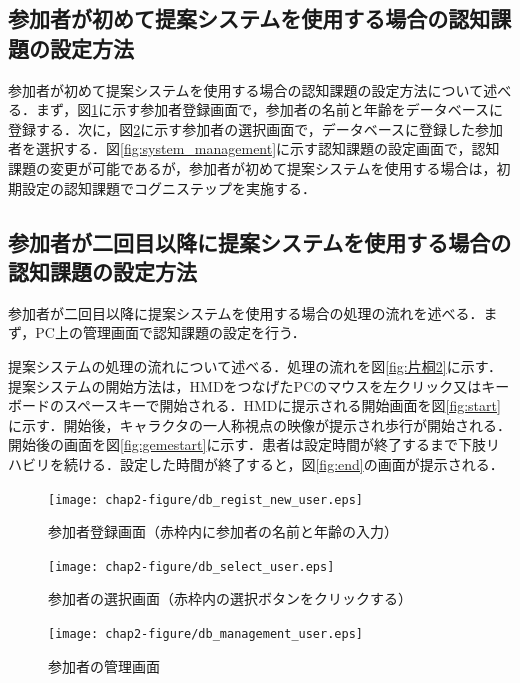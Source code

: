 \subsection{参加者が初めて提案システムを使用する場合の認知課題の設定方法}
参加者が初めて提案システムを使用する場合の認知課題の設定方法について述べる．まず，図\ref{fig:db_regist_new_user}に示す参加者登録画面で，参加者の名前と年齢をデータベースに登録する．次に，図\ref{fig:db_select_user}に示す参加者の選択画面で，データベースに登録した参加者を選択する．図\ref{fig:system_management}に示す認知課題の設定画面で，認知課題の変更が可能であるが，参加者が初めて提案システムを使用する場合は，初期設定の認知課題でコグニステップを実施する．

\subsection{参加者が二回目以降に提案システムを使用する場合の認知課題の設定方法}
参加者が二回目以降に提案システムを使用する場合の処理の流れを述べる．まず，PC上の管理画面で認知課題の設定を行う．


提案システムの処理の流れについて述べる．処理の流れを図\ref{fig:片桐2}に示す．
提案システムの開始方法は，HMDをつなげたPCのマウスを左クリック又はキーボードのスペースキーで開始される．HMDに提示される開始画面を図\ref{fig:start}に示す．開始後，キャラクタの一人称視点の映像が提示され歩行が開始される．開始後の画面を図\ref{fig:gemestart}に示す．患者は設定時間が終了するまで下肢リハビリを続ける．設定した時間が終了すると，図\ref{fig:end}の画面が提示される．
\fi

\begin{figure}[tbp]
	\centering
			\texttt{[image: chap2-figure/db\_regist\_new\_user.eps]}
	\caption{参加者登録画面（赤枠内に参加者の名前と年齢の入力）}
	\label{fig:db_regist_new_user}
\end{figure}

\begin{figure}[tbp]
	\centering
			\texttt{[image: chap2-figure/db\_select\_user.eps]}
	\caption{参加者の選択画面（赤枠内の選択ボタンをクリックする）}
	\label{fig:db_select_user}
\end{figure}

\begin{figure}[tbp]
	\centering
			\texttt{[image: chap2-figure/db\_management\_user.eps]}
	\caption{参加者の管理画面}
	\label{fig:db_management_user}
\end{figure}
\fi


